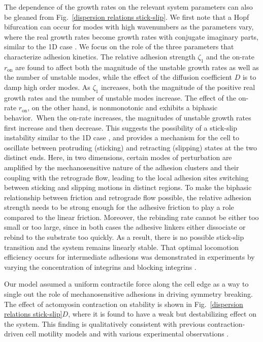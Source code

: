 \documentclass[12pt]{article}
\begin{document}
        The dependence of the growth rates on the relevant system parameters can also be gleaned from Fig.~\ref{dispersion relations stick-slip}. We first note that a Hopf bifurcation can occur for modes with high wavenumbers as the parameters vary, where the real growth rates become growth rates with conjugate imaginary parts, similar to the 1D case \cite{sens2020stick}. 
        We focus on the role of the three parameters that characterize adhesion kinetics. 
        The relative adhesion strength $\zeta_1$ and the on-rate $r_\text{on}$ are found to affect both the magnitude of the unstable growth rates as well as the number of unstable modes, while the effect of the diffusion coefficient $D$ is to damp high order modes. 
        As $\zeta_1$ increases, both the magnitude of the positive real growth rates and the number of unstable modes increase. 
        The effect of the on-rate $r_\text{on}$, on the other hand, is nonmonotonic and exhibits a biphasic behavior.\ 
        When the on-rate increases, the magnitudes of unstable growth rates first increase and then decrease. 
        This suggests the possibility of a stick-slip instability similar to the 1D case \cite{sens2020stick}, and provides a mechanism for the cell to oscillate between protruding (sticking) and retracting (slipping) states at the two distinct ends. 
        Here, in two dimensions, certain modes of perturbation are amplified by the mechanosensitive nature of the adhesion clusters and their coupling with the retrograde flow, leading to the local adhesion sites switching between sticking and slipping motions in distinct regions. 
        To make the biphasic relationship between friction and retrograde flow possible, the relative adhesion strength needs to be strong enough for the adhesive friction to play a role compared to the linear friction. 
        Moreover, the rebinding rate cannot be either too small or too large, since in both cases the adhesive linkers either dissociate or rebind to the substrate too quickly. As a result, there is no possible stick-slip transition and the system remains linearly stable. 
        That optimal locomotion efficiency occurs for intermediate adhesions was demonstrated in experiments by varying the concentration of integrins and blocking integrins \cite{palecek1997integrin}. 
        
        Our model assumed a uniform contractile force along the cell edge as a way to single out the role of mechanosensitive adhesions in driving symmetry breaking. The effect of actomyosin contraction on stability is shown in Fig.~\ref{dispersion relations stick-slip}$D$, where it is found to have a weak but destabilizing effect on the system. This finding is qualitatively consistent with previous contraction-driven cell motility models and with  various experimental observations \cite{recho2013contraction, barnhart2015balance, safsten2022asymptotic}. 
        
\end{document}
